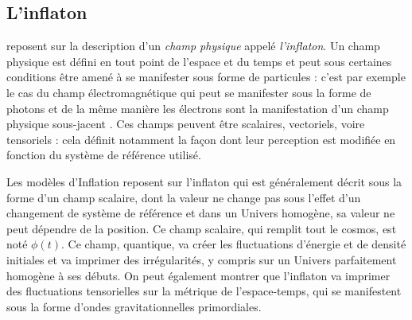 \subsection{L'inflaton}
 reposent sur la description d'un \textit{champ physique} appelé \textit{l'inflaton}. Un champ physique est défini en tout point de l'espace et du temps et peut sous certaines conditions être amené à se manifester sous forme de particules : c'est par exemple le cas du champ électromagnétique qui peut se manifester sous la forme de photons et de la même manière les électrons sont la manifestation d'un champ physique sous-jacent . Ces champs peuvent être scalaires, vectoriels, voire tensoriels : cela définit notamment la façon dont leur perception est modifiée en fonction du système de référence utilisé.

Les modèles d'Inflation reposent sur l'inflaton qui est généralement décrit sous la forme d'un champ scalaire, dont la valeur ne change pas sous l'effet d'un changement de système de référence et dans un Univers homogène, sa valeur ne peut dépendre de la position. Ce champ scalaire, qui remplit tout le cosmos, est noté $\phi(t)$. Ce champ, quantique, va créer les fluctuations d'énergie et de densité initiales et va imprimer des irrégularités, y compris sur un Univers parfaitement homogène à ses débuts. On peut également montrer que l'inflaton va imprimer des fluctuations tensorielles sur la métrique de l'espace-temps, qui se manifestent sous la forme d'ondes gravitationnelles primordiales.

